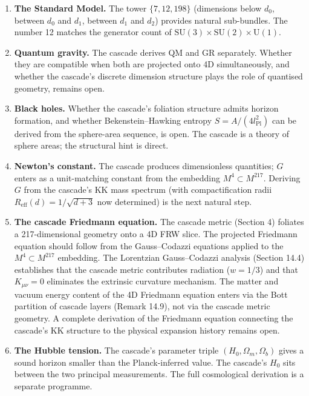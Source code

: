 \documentclass[12pt,a4paper]{article}
\begin{document}
\begin{enumerate}
\item \textbf{The Standard Model.} The tower $\{7, 12, 198\}$ (dimensions below $d_0$, between $d_0$
and $d_1$, between $d_1$ and $d_2$) provides natural sub-bundles. The number 12 matches
the generator count of $\text{SU}(3) \times \text{SU}(2) \times \text{U}(1)$.
\item \textbf{Quantum gravity.} The cascade derives QM and GR separately. Whether they
are compatible when both are projected onto 4D simultaneously, and whether the
cascade's discrete dimension structure plays the role of quantised geometry, remains
open.
\item \textbf{Black holes.} Whether the cascade's foliation structure admits horizon formation,
and whether Bekenstein--Hawking entropy $S = A/(4l_{\text{Pl}}^2)$ can be derived from the
sphere-area sequence, is open. The cascade is a theory of sphere areas; the structural
hint is direct.
\item \textbf{Newton's constant.} The cascade produces dimensionless quantities; $G$ enters as
a unit-matching constant from the embedding $M^4 \subset M^{217}$. Deriving $G$ from the
cascade's KK mass spectrum (with compactification radii $R_{\text{eff}}(d) = 1/\sqrt{d + 3}$ now
determined) is the next natural step.
\item \textbf{The cascade Friedmann equation.} The cascade metric (Section 4) foliates a
217-dimensional geometry onto a 4D FRW slice. The projected Friedmann equation
should follow from the Gauss--Codazzi equations applied to the $M^4 \subset M^{217}$ embedding. The Lorentzian Gauss--Codazzi analysis (Section 14.4) establishes that the
cascade metric contributes radiation ($w = 1/3$) and that $K_{\mu\nu} = 0$ eliminates the
extrinsic curvature mechanism. The matter and vacuum energy content of the 4D
Friedmann equation enters via the Bott partition of cascade layers (Remark 14.9), not
via the cascade metric geometry. A complete derivation of the Friedmann equation
connecting the cascade's KK structure to the physical expansion history remains
open.
\item \textbf{The Hubble tension.} The cascade's parameter triple $(H_0, \Omega_m, \Omega_b)$ gives a sound
horizon smaller than the Planck-inferred value. The cascade's $H_0$ sits between
the two principal measurements. The full cosmological derivation is a separate
programme.
\end{enumerate}
\end{document}
